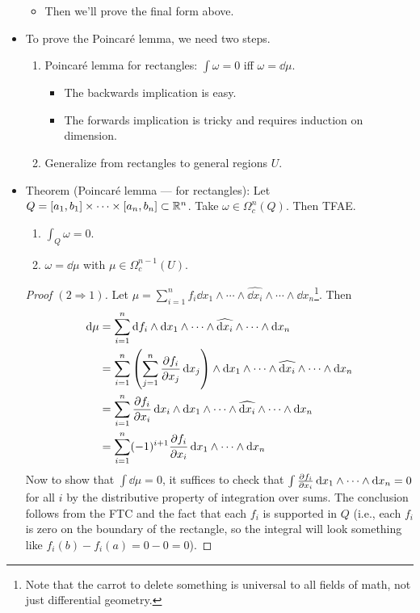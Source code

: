 \documentclass[../notes.tex]{subfiles}
\begin{document}
\begin{itemize}
\begin{itemize}
        \item Then we'll prove the final form above.
    \end{itemize}
    \item To prove the Poincar\'{e} lemma, we need two steps.
    \begin{enumerate}
        \item Poincar\'{e} lemma for rectangles: $\int\omega=0$ iff $\omega=\dd{\mu}$.
        \begin{itemize}
            \item The backwards implication is easy.
            \item The forwards implication is tricky and requires induction on dimension.
        \end{itemize}
        \item Generalize from rectangles to general regions $U$.
    \end{enumerate}
    \item Theorem (Poincar\'{e} lemma --- for rectangles): Let $Q=[a_1,b_1]\times\cdots\times[a_n,b_n]\subset\mathbb{R}^n$. Take $\omega\in\Omega_c^n(Q)$. Then TFAE.
    \begin{enumerate}
        \item $\int_Q\omega=0$.
        \item $\omega=\dd{\mu}$ with $\mu\in\Omega_c^{n-1}(U)$.
    \end{enumerate}
    \begin{proof}[Proof $(2\Rightarrow 1)$]
        Let $\mu=\sum_{i=1}^nf_i\dd{x_1}\wedge\cdots\wedge\widehat{\dd{x_i}}\wedge\cdots\wedge\dd{x_n}$\footnote{Note that the carrot to delete something is universal to all fields of math, not just differential geometry.}. Then
        \begin{align*}
            \dd\mu &= \sum_{i=1}^n\dd{f_i}\wedge\dd{x_1}\wedge\cdots\wedge\widehat{\dd{x_i}}\wedge\cdots\wedge\dd{x_n}\\
            &= \sum_{i=1}^n\left( \sum_{j=1}^n\pdv{f_i}{x_j}\dd{x_j} \right)\wedge\dd{x_1}\wedge\cdots\wedge\widehat{\dd{x_i}}\wedge\cdots\wedge\dd{x_n}\\
            &= \sum_{i=1}^n\pdv{f_i}{x_i}\dd{x_i}\wedge\dd{x_1}\wedge\cdots\wedge\widehat{\dd{x_i}}\wedge\cdots\wedge\dd{x_n}\\
            &= \sum_{i=1}^n(-1)^{i+1}\pdv{f_i}{x_i}\dd{x_1}\wedge\cdots\wedge\dd{x_n}
        \end{align*}
        Now to show that $\int\dd{\mu}=0$, it suffices to check that $\int\pdv{f_i}{x_i}\dd{x_1}\wedge\cdots\wedge\dd{x_n}=0$ for all $i$ by the distributive property of integration over sums. The conclusion follows from the FTC and the fact that each $f_i$ is supported in $Q$ (i.e., each $f_i$ is zero on the boundary of the rectangle, so the integral will look something like $f_i(b)-f_i(a)=0-0=0$).

\end{proof}
\end{itemize}
\end{document}
